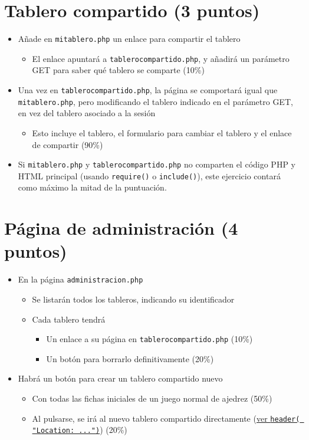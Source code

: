 \documentclass[a4paper]{article}
\begin{document}
\section{Tablero compartido (3 puntos)}
\label{sec:org0000006}
\begin{itemize}
\item Añade en \texttt{mitablero.php} un enlace para compartir el tablero
\begin{itemize}
\item El enlace apuntará a \texttt{tablerocompartido.php}, y añadirá un parámetro GET para saber qué tablero se comparte (10\%)
\end{itemize}
\item Una vez en \texttt{tablerocompartido.php}, la página se comportará igual que \texttt{mitablero.php}, pero modificando el tablero indicado en el parámetro GET, en vez del tablero asociado a la sesión
\begin{itemize}
\item Esto incluye el tablero, el formulario para cambiar el tablero y el enlace de compartir (90\%)
\end{itemize}
\item Si \texttt{mitablero.php} y \texttt{tablerocompartido.php} no comparten el código PHP y HTML principal (usando \texttt{require()} o \texttt{include()}), este ejercicio contará como máximo la mitad de la puntuación.
\end{itemize}
\section{Página de administración (4 puntos)}
\label{sec:org0000009}
\begin{itemize}
\item En la página \texttt{administracion.php}
\begin{itemize}
\item Se listarán todos los tableros, indicando su identificador
\item Cada tablero tendrá
\begin{itemize}
\item Un enlace a su página en \texttt{tablerocompartido.php} (10\%)
\item Un botón para borrarlo definitivamente (20\%)
\end{itemize}
\end{itemize}
\item Habrá un botón para crear un tablero compartido nuevo
\begin{itemize}
\item Con todas las fichas iniciales de un juego normal de ajedrez (50\%)
\item Al pulsarse, se irá al nuevo tablero compartido directamente (\href{https://stackoverflow.com/questions/768431/how-do-i-make-a-redirect-in-php}{ver \texttt{header( "Location: ...")}}) (20\%)
\end{itemize}
\end{itemize}
\end{document}
